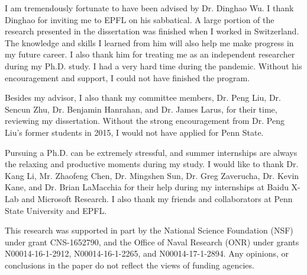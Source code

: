 I am tremendously fortunate to have been advised by Dr. Dinghao Wu.  I thank Dinghao for inviting me to EPFL on his sabbatical. A large portion of the research presented in the dissertation was finished when I worked in Switzerland. The knowledge and skills I learned from him will also help me make progress in my future career. I also thank him for treating me as an independent researcher during my Ph.D. study. I had a very hard time during the pandemic. Without his encouragement and support, I could not have finished the program.

Besides my advisor, I also thank my committee members, Dr. Peng Liu, Dr. Sencun Zhu, Dr. Benjamin Hanrahan, and Dr. James Larus, for their time, reviewing my dissertation. Without the strong encouragement from Dr. Peng Liu's former students in 2015, I would not have applied for Penn State.

Pursuing a Ph.D. can be extremely stressful, and summer internships are always the relaxing and productive moments during my study. I would like to thank Dr. Kang Li, Mr. Zhaofeng Chen, Dr. Mingshen Sun, Dr. Greg Zaverucha, Dr. Kevin Kane, and Dr. Brian LaMacchia for their help during my internships at Baidu X-Lab and Microsoft Research.  I also thank my friends and collaborators at Penn State University and EPFL. 

This research was supported in part by the National Science Foundation (NSF) under grant CNS-1652790, and the Office of Naval Research (ONR) under grants N00014-16-1-2912, N00014-16-1-2265, and N00014-17-1-2894. Any opinions, or conclusions in the paper do not reflect the views of funding agencies.


